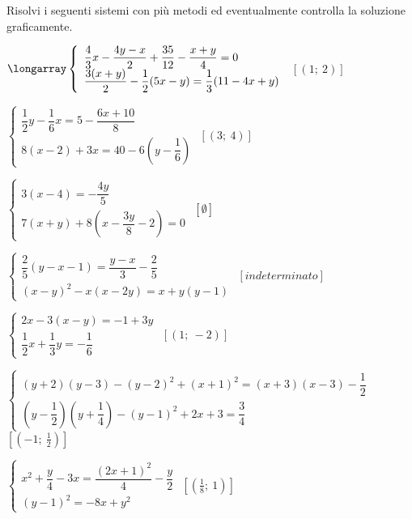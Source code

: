 \begin{esercizio}[\Ast]
 \label{ese:22.75}
 Risolvi i seguenti sistemi con più metodi ed eventualmente controlla
la soluzione graficamente.
\begin{enumeratea}
 {\longarray
 \item $\longarray\left\{\begin{array}{l}
 \dfrac{4}{3}x-\dfrac{4y-x}{2}+\dfrac{35}{12}-\dfrac{x+y}{4}=0\\
 \dfrac{3(x+y)}{2}-\dfrac{1}{2}(5x-y)=\dfrac{1}{3}(11-4x+y)\end{array}\right.$
 \hfill $\left[(1;~2)\right]$
\item $\left\{\begin{array}{l}
\dfrac{1}{2}y-\dfrac{1}{6}x=5-\dfrac{6x+10}{8}\\
8(x-2)+3x=40-6\left(y-\dfrac{1}{6}\right)\end{array}\right.$
 \hfill $\left[(3;~4)\right]$
\item $\left\{\begin{array}{l}
3(x-4)=-{\dfrac{4y}{5}}\\
7(x+y)+8\left(x-\dfrac{3y}{8}
-2\right)=0\end{array}\right.$
 \hfill $\left[\emptyset\right]$
\item $\left\{\begin{array}{l}
\dfrac{2}{5}(y-x-1)=\dfrac{y-x}{3}-\dfrac{2}{5}\\
(x-y)^{2}-x(x-2y)=x+y(y-1)\end{array}\right.$
 \hfill $\left[indeterminato\right]$
\item $\left\{\begin{array}{l}
2x-3(x-y)=-1+3y\\
\dfrac{1}{2}x+\dfrac{1}{3}y=-{\dfrac{1}{6}}\end{array}\right.$
 \hfill $\left[(1;~-2)\right]$
\item $\left\{\begin{array}{l}
(y+2)(y-3)-(y-2)^{2}+(x+1)^{2}=(x+3)(x-3)-\dfrac{1}{2}\\
\left(y-\dfrac{1}{2}\right)\left(y+\dfrac{1}{4}\right)-(y-1)^{2}+2x+3=
    \dfrac{3}{4}\end{array}\right.$
 \hfill $\left[(-1;~\frac{1}{2})\right]$
\item $\left\{\begin{array}{l}
x^{2}+\dfrac{y}{4}-3x=\dfrac{(2x+1)^{2}}{4}-\dfrac{y}{2}\\
(y-1)^{2}=-8x+y^{2}\end{array}\right.$
 \hfill $\left[(\frac{1}{8};~1)\right]$
}
\end{enumeratea}
\end{esercizio}
